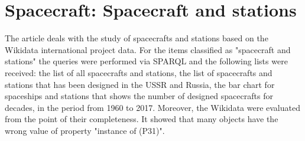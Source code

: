 
\chapter{Spacecraft: Spacecraft and stations}


The article deals with the study of spacecrafts and stations based on the Wikidata international project data. For the items classified as "spacecraft and stations" the queries were performed via SPARQL and the following lists were received: the list of all spacecrafts and stations, the list of spacecrafts and stations that has been designed in the USSR and Russia, the bar chart for spaceships and stations that shows the number of designed spacecrafts for decades, in the period from 1960 to 2017. Moreover, the Wikidata were evaluated from the point of their completeness. It showed that many objects have the wrong value of property "instance of (P31)".
